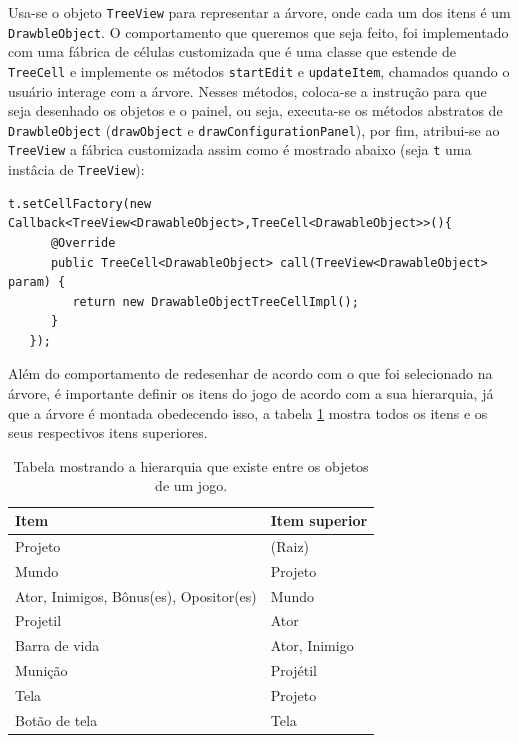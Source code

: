 \documentclass[12pt,oneside,openright,a4paper,english,brazil,sumario=tradicional]{abntex2}
\begin{document}
Usa-se o objeto \texttt{TreeView} para representar a árvore, onde cada um dos itens é um \texttt{DrawbleObject}. O comportamento que queremos que seja feito, foi implementado com uma fábrica de células customizada que é uma classe que estende de \texttt{TreeCell} e implemente os métodos \texttt{startEdit} e \texttt{updateItem}, chamados quando o usuário interage com a árvore. Nesses métodos, coloca-se a instrução para que seja desenhado os objetos e o painel, ou seja, executa-se os métodos abstratos de \texttt{DrawbleObject} (\texttt{drawObject} e \texttt{drawConfigurationPanel}),  por fim, atribui-se ao \texttt{TreeView} a fábrica customizada assim como é mostrado abaixo (seja \texttt{t} uma instâcia de \texttt{TreeView}):

\begin{lstlisting}[frame=single]
   t.setCellFactory(new Callback<TreeView<DrawableObject>,TreeCell<DrawableObject>>(){
      @Override
      public TreeCell<DrawableObject> call(TreeView<DrawableObject> param) {
         return new DrawableObjectTreeCellImpl();
      }
   });
\end{lstlisting}

Além do comportamento de redesenhar de acordo com o que foi selecionado na árvore, é importante definir os itens do jogo de acordo com a sua hierarquia, já que a árvore é montada obedecendo isso, a tabela \ref{table:obj-hierarquia} mostra todos os itens e os seus respectivos itens superiores.

\begin{table}[h]
   \centering
   \begin{tabular}{| p{8cm} | l | }
      \hline
      \textbf{Item} & \textbf{Item superior} \\
      \hline
      Projeto & (Raiz) \\
      Mundo & Projeto \\
      Ator, Inimigos, Bônus(es), Opositor(es) & Mundo \\
      Projetil & Ator \\
      Barra de vida & Ator, Inimigo \\
      Munição & Projétil \\
      Tela & Projeto \\
      Botão de tela & Tela \\
      \hline
   \end{tabular}
   \caption{Tabela mostrando a hierarquia que existe entre os objetos de um jogo.}
   \label{table:obj-hierarquia}
\end{table}
\end{document}
